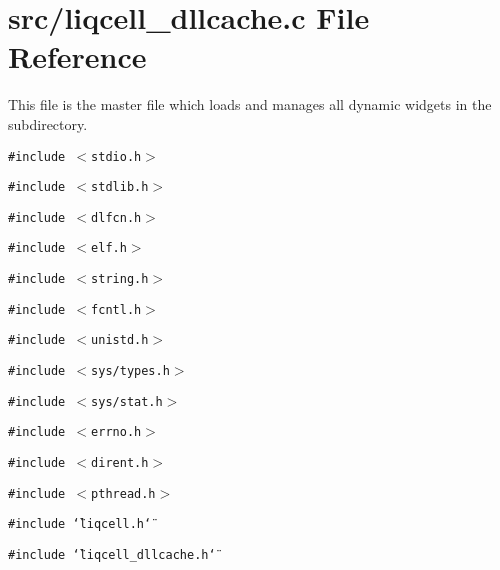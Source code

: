 \section{src/liqcell\_\-dllcache.c File Reference}
\label{d4/d58/liqcell__dllcache_8c}
This file is the master file which loads and manages all dynamic widgets in the subdirectory.  


{\tt \#include $<$stdio.h$>$}\par
{\tt \#include $<$stdlib.h$>$}\par
{\tt \#include $<$dlfcn.h$>$}\par
{\tt \#include $<$elf.h$>$}\par
{\tt \#include $<$string.h$>$}\par
{\tt \#include $<$fcntl.h$>$}\par
{\tt \#include $<$unistd.h$>$}\par
{\tt \#include $<$sys/types.h$>$}\par
{\tt \#include $<$sys/stat.h$>$}\par
{\tt \#include $<$errno.h$>$}\par
{\tt \#include $<$dirent.h$>$}\par
{\tt \#include $<$pthread.h$>$}\par
{\tt \#include \char`\"{}liqcell.h\char`\"{}}\par
{\tt \#include \char`\"{}liqcell\_\-dllcache.h\char`\"{}}\par
